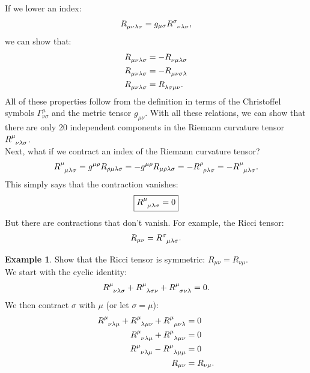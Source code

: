 \documentclass{article}
\theoremstyle{definition}
\newtheorem{exmp}{Example}[section]
\begin{document}
If we lower an index:
\begin{align*}
\tensor{R}{_{\mu\nu\lambda\sigma}} = g_{\mu\sigma}\tensor{R}{^{\sigma}_{\nu\lambda\sigma}},
\end{align*} 
we can show that:
\begin{align*}
\tensor{R}{_{\mu\nu\lambda\sigma}} &= -\tensor{R}{_{\nu\mu\lambda\sigma}}\\
\tensor{R}{_{\mu\nu\lambda\sigma}} &= -\tensor{R}{_{\mu\nu\sigma\lambda}}\\
\tensor{R}{_{\mu\nu\lambda\sigma}} &= \tensor{R}{_{\lambda\sigma\mu\nu}}.
\end{align*}
All of these properties follow from the definition in terms of the Christoffel symbols $\Gamma^{\mu}_{\nu\sigma}$ and the metric tensor $g_{\mu\nu}$. With all these relations, we can show that there are only 20 independent components in the Riemann curvature tensor $\tensor{R}{^{\mu}_{\nu\lambda\sigma}}$.\\

Next, what if we contract an index of the Riemann curvature tensor? 
\begin{align*}
\tensor{R}{^{\mu}_{\mu\lambda\sigma}} = g^{\mu\rho}R_{\rho\mu\lambda\sigma} = -g^{\mu\rho}R_{\mu\rho\lambda\sigma} = -\tensor{R}{^{\rho}_{\rho\lambda\sigma}} = -\tensor{R}{^\mu_{\mu\lambda\sigma}}.
\end{align*}
This simply says that the contraction vanishes:
\begin{align*}
\boxed{\tensor{R}{^{\mu}_{\mu\lambda\sigma}} = 0}
\end{align*}
But there are contractions that don't vanish. For example, the Ricci tensor:
\begin{align*}
R_{\mu\nu} = \tensor{R}{^{\sigma}_{\mu\lambda\sigma}}. 
\end{align*}

\begin{exmp}
	Show that the Ricci tensor is symmetric: $R_{\mu\nu} = R_{\nu\mu}$.\\
	
	We start with the cyclic identity: 
	\begin{align*}
	\tensor{R}{^{\mu}_{\nu\lambda\sigma}} + \tensor{R}{^{\mu}_{\lambda\sigma\nu}} + \tensor{R}{^{\mu}_{\sigma\nu\lambda}} = 0.
	\end{align*}
	We then contract $\sigma$ with $\mu$ (or let $\sigma = \mu$):
	\begin{align*}
	\tensor{R}{^{\mu}_{\nu\lambda\mu}} + \tensor{R}{^{\mu}_{\lambda\mu\nu}} + \tensor{R}{^{\mu}_{\mu\nu\lambda}} &= 0\\
	\tensor{R}{^{\mu}_{\nu\lambda\mu}} + \tensor{R}{^{\mu}_{\lambda\mu\nu}} &= 0\\
	\tensor{R}{^{\mu}_{\nu\lambda\mu}} - \tensor{R}{^{\mu}_{\lambda\mu\mu}} &= 0\\
	R_{\mu\nu} &= R_{\nu\mu}.
	\end{align*}
	
\end{exmp}
\end{document}
